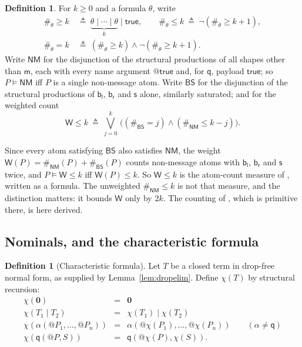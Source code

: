 \documentclass[11pt]{article}
\makeatletter
\theoremstyle{plain}
\theoremstyle{definition}
\newtheorem{definition}[theorem]{Definition}
\theoremstyle{remark}
\newcommand{\quo}[1]{@#1}
\newcommand{\nil}{\mathbf{0}}
\newcommand{\mm}{\mathsf{m}}
\newcommand{\bl}{\mathsf{b}_{\mathsf{l}}}
\newcommand{\br}{\mathsf{b}_{\mathsf{r}}}
\newcommand{\sy}{\mathsf{s}}
\newcommand{\qq}{\mathsf{q}}
\newcommand{\sat}{\models}
\newcommand{\chf}[1]{\chi(#1)}
\newcommand{\shp}{\mathsf{NM}}
\newcommand{\shpb}{\mathsf{BS}}
\newcommand{\Wt}{\mathsf{W}}
\makeatother
\begin{document}
\begin{definition}
\label{def:count}
For $k \geq 0$ and a formula $\theta$, write
\begin{align*}
  \#_{\theta} \geq k \ &\triangleq\ \underbrace{\theta \mid \cdots \mid
  \theta}_{k} \mid \mathsf{true},
  \qquad
  \#_{\theta} \leq k \ \triangleq\ \neg(\#_{\theta} \geq k{+}1),\\
  \#_{\theta} = k \ &\triangleq\ (\#_{\theta} \geq k) \wedge
  \neg(\#_{\theta} \geq k{+}1).
\end{align*}
Write $\shp$ for the disjunction of the structural productions of all shapes
other than $\mm$, each with every name argument $\quo{\mathsf{true}}$ and,
for $\qq$, payload $\mathsf{true}$; so $P \sat \shp$ iff $P$ is a single
non-message atom. Write $\shpb$ for the disjunction of the structural
productions of $\bl$, $\br$ and $\sy$ alone, similarly saturated; and for the
weighted count
\[
  \Wt \leq k \ \triangleq\ \bigvee_{j=0}^{k}\,
  \bigl( (\#_{\shpb} = j) \wedge (\#_{\shp} \leq k - j) \bigr).
\]
\end{definition}

Since every atom satisfying $\shpb$ also satisfies $\shp$, the weight
$\Wt(P) = \#_{\shp}(P) + \#_{\shpb}(P)$ counts non-message atoms with $\bl$,
$\br$ and $\sy$ twice, and $P \sat \Wt \leq k$ iff $\Wt(P) \leq k$. So
$\Wt \leq k$ is the atom-count measure of \cite[Lem.~9.2]{rhocomb3}, written
as a formula. The unweighted $\#_{\shp} \leq k$ is not that measure, and the
distinction matters: it bounds $\Wt$ only by $2k$. The counting of
\cite{f1r3space}, which is primitive there, is here derived.

\subsection{Nominals, and the characteristic formula}

\begin{definition}[Characteristic formula]
\label{def:char}
Let $T$ be a closed term in drop-free normal form, as supplied by
Lemma~\ref{lem:dropelim}. Define $\chf{T}$ by structural recursion:
\[
\begin{array}{rcl}
  \chf{\nil} &=& \nil\\
  \chf{T_1 \mid T_2} &=& \chf{T_1} \mid \chf{T_2}\\
  \chf{\alpha(\quo{P_1},\dots,\quo{P_n})} &=&
     \alpha(\quo{\chf{P_1}},\dots,\quo{\chf{P_n}})
     \qquad (\alpha \neq \qq)\\
  \chf{\qq(\quo{P},S)} &=& \qq(\quo{\chf{P}},\chf{S}).
\end{array}
\]
\end{definition}
\end{document}
